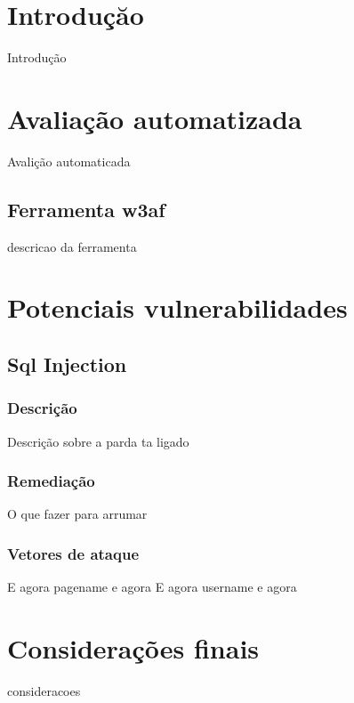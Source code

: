 \documentclass{ufscThesis}
\newcommand{\+}{\discretionary{\mbox{${\bm\cdot}\mkern-1mu$}}{}{}}
\renewcommand\+{\discretionary{}{}{}}
\begin{document}
\capa  

\sumario

\chapter{Introduçăo}
Introdução

\chapter{Avaliação automatizada}
Avalição automaticada

\section{Ferramenta w3af}
descricao da ferramenta

\chapter{Potenciais vulnerabilidades}

\section{Sql Injection}

\subsection{Descrição}

Descrição sobre a parda ta ligado

\subsection{Remediação}

O que fazer para arrumar

\subsection{Vetores de ataque}

E agora pagename
e agora
E agora username
e agora


\chapter{Considerações finais}
consideracoes
\end{document}
